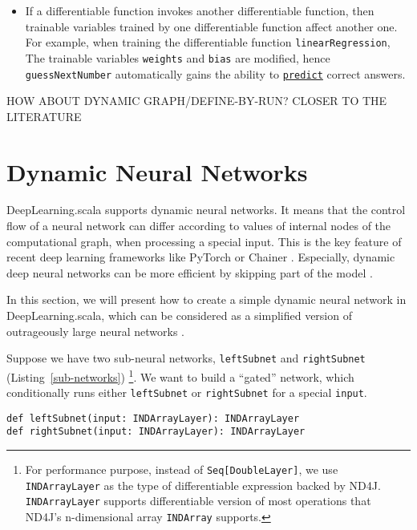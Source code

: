 \begin{itemize}
  \item If a \gls{differentiable function} invokes another \gls{differentiable function}, then \glspl{trainable variable} trained by one \gls{differentiable function} affect another one. For example, when training the \gls{differentiable function} \lstinline{linearRegression}, The \glspl{trainable variable} \lstinline{weights} and \lstinline{bias} are modified, hence \lstinline{guessNextNumber} automatically gains the ability to \href{https://javadoc.io/page/com.thoughtworks.deeplearning/deeplearning_2.11/latest/com/thoughtworks/deeplearning/DeepLearning.html#predict(differentiable:Differentiable):com.thoughtworks.future.Future[DeepLearning.this.Data]}{\lstinline{predict}} correct answers.
\end{itemize}

HOW ABOUT DYNAMIC GRAPH/DEFINE-BY-RUN? CLOSER TO THE LITERATURE
\section{Dynamic Neural Networks}

DeepLearning.scala supports dynamic neural networks. It means that the control flow of a neural network can differ according to values of internal nodes of the computational graph, when processing a special input. This is the key feature of recent deep learning frameworks like PyTorch \cite{paszke2017pytorch} or Chainer \cite{tokui2015chainer}. Especially, dynamic deep neural networks can be more efficient by skipping part of the model \cite{liu2017dynamic}.

In this section, we will present how to create a simple dynamic neural network in DeepLearning.scala, which can be considered as a simplified version of outrageously large neural networks \cite{shazeer2017outrageously}.

Suppose we have two sub-neural networks, \lstinline{leftSubnet} and \lstinline{rightSubnet} (Listing~\ref{sub-networks}) \footnote{
  For performance purpose, instead of \lstinline{Seq[DoubleLayer]}, we use \lstinline{INDArrayLayer} as the type of \gls{differentiable expression} backed by ND4J. \lstinline{INDArrayLayer} supports differentiable version of most operations that ND4J's n-dimensional array \lstinline{INDArray} supports.
}. We want to build a ``gated'' network, which conditionally runs either \lstinline{leftSubnet} or \lstinline{rightSubnet} for a special \lstinline{input}.

\begin{lstlisting}[float={h t b p},caption={Predefined sub-networks},label={sub-networks}]
def leftSubnet(input: INDArrayLayer): INDArrayLayer
def rightSubnet(input: INDArrayLayer): INDArrayLayer
\end{lstlisting}

